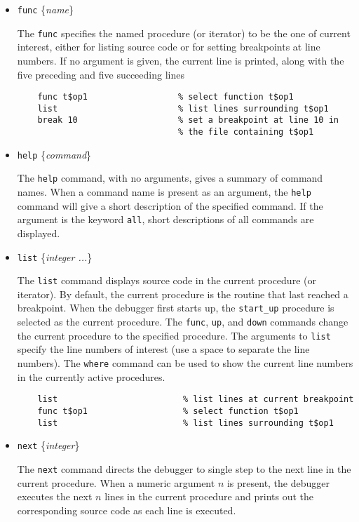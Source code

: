 \begin{itemize}
\item {\tt func} \{{\it name}\}
  
  The {\tt func} specifies the named procedure (or iterator) to be the
  one of current interest, either for listing source code or for setting
  breakpoints at line numbers.  If no argument is given, the current
  line is printed, along with the five preceding and five succeeding
  lines
  \begin{verbatim}
    func t$op1                  % select function t$op1
    list                        % list lines surrounding t$op1
    break 10                    % set a breakpoint at line 10 in 
                                % the file containing t$op1
  \end{verbatim}

\item {\tt help} \{{\it command}\}
  
  The {\tt help} command, with no arguments, gives a summary of
  command names.  When a command name is present as an argument, the
  {\tt help} command will give a short description of the specified
  command.  If the argument is the keyword {\tt all}, short
  descriptions of all commands are displayed.

\item {\tt list} \{{\it integer ...}\}
  
  The {\tt list} command displays source code in the current procedure
  (or iterator).  By default, the current procedure is the routine that
  last reached a breakpoint.  When the debugger first starts up, the
  {\tt start\_up} procedure is selected as the current procedure.  The
  {\tt func}, {\tt up}, and {\tt down} commands change the current
  procedure to the specified procedure.  The arguments to {\tt list}
  specify the line numbers of interest (use a space to separate the line
  numbers).  The {\tt where} command can be used to show the current
  line numbers in the currently active procedures.
  \begin{verbatim}
    list                         % list lines at current breakpoint
    func t$op1                   % select function t$op1
    list                         % list lines surrounding t$op1
  \end{verbatim}

\item {\tt next} \{{\it integer}\}
  
  The {\tt next} command directs the debugger to single step to the next
  line in the current procedure.  When a numeric argument $n$ is
  present, the debugger executes the next $n$ lines in the current
  procedure and prints out the corresponding source code as each line is
  executed.


\end{itemize}
